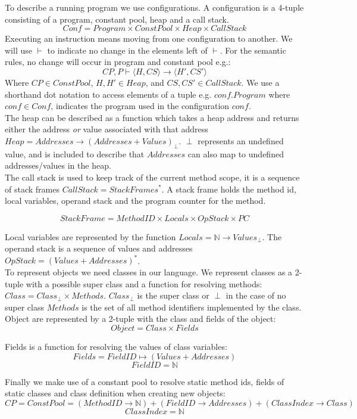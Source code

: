 To describe a running program we use configurations.
A configuration is a 4-tuple consisting of a program, constant pool, heap and a call stack. 
$$Conf = Program \times ConstPool \times Heap \times CallStack$$
Executing an instruction means moving from one configuration to another. 
We will use $\vdash$ to indicate no change in the elements left of $\vdash$. 
For the semantic rules, no change will occur in program and constant pool e.g.:
$$CP, P \vdash \langle H, CS \rangle \rightarrow \langle H', CS' \rangle$$
Where $CP \in ConstPool$, $H,H' \in Heap$, and $CS, CS' \in CallStack$.
We use a shorthand dot notation to access elements of a tuple e.g. $conf.Program$ where $conf \in Conf$, indicates the program used in the configuration $conf$.\\

The heap can be described as a function which takes a heap address and returns either the address \textit{or} value associated with that address $Heap = Addresses \to   (Addresses + Values)_\perp$. $\perp$ represents an undefined value, and is included to describe that $Addresses$ can also map to undefined addresses/values in the heap.\\

The call stack is used to keep track of the current method scope, it is a sequence of stack frames $CallStack = StackFrames^{*}$.
A stack frame holds the method id, local variables, operand stack and the program counter for the method.

$$StackFrame = MethodID \times Locals \times OpStack \times PC $$

Local variables are represented by the function $Locals = \mathbb{N} \to   Values_\perp$. 
The operand stack is a sequence of values and addresses $OpStack = (Values + Addresses)^{*}$. \\

To represent objects we need classes in our language.
We represent classes as a 2-tuple with a possible super class and a function for resolving methods: $Class = Class_\perp \times Methods$.
$Class_\perp$ is the super class or $\perp$ in the case of no super class  
$Methods$ is the set of all method identifiers implemented by the class.
Object are represented by a 2-tuple with the class and fields of the object: 
$$Object = Class \times Fields$$ 

Fields is a function for resolving the values of class variables:
$$Fields = FieldID \mapsto (Values + Addresses)$$ 
$$FieldID = \mathbb{N}$$

Finally we make use of a constant pool to resolve static method ids, fields of static classes and class definition when creating new objects:
$$CP = ConstPool = (MethodID \to \mathbb{N}) + (FieldID \to Addresses) + (ClassIndex \to  Class)$$
$$ClassIndex = \mathbb{N}$$

